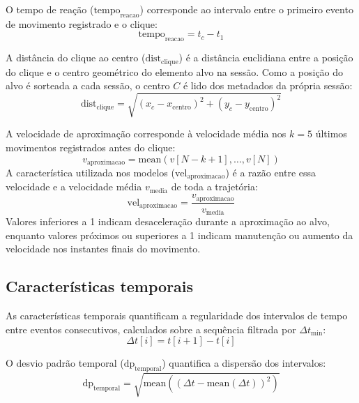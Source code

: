 O tempo de reação ($\text{tempo}_{\text{reacao}}$) corresponde ao intervalo entre o primeiro evento de movimento registrado e o clique:
\begin{equation}
    \text{tempo}_{\text{reacao}} = t_c - t_1
    \label{eq:tempo_reacao}
\end{equation}

A distância do clique ao centro ($\text{dist}_{\text{clique}}$) é a distância euclidiana entre a posição do clique e o centro geométrico do elemento alvo na sessão. Como a posição do alvo é sorteada a cada sessão, o centro $C$ é lido dos metadados da própria sessão:
\begin{equation}
    \text{dist}_{\text{clique}} = \sqrt{(x_c - x_{\text{centro}})^2 + (y_c - y_{\text{centro}})^2}
    \label{eq:dist_clique}
\end{equation}

A velocidade de aproximação corresponde à velocidade média nos $k = 5$ últimos movimentos registrados antes do clique:
\begin{equation}
    v_{\text{aproximacao}} = \text{mean}\left(v[N-k+1], \ldots, v[N]\right)
    \label{eq:v_aproximacao}
\end{equation}
A característica utilizada nos modelos ($\text{vel}_{\text{aproximacao}}$) é a razão entre essa velocidade e a velocidade média $v_{\text{media}}$ de toda a trajetória:
\begin{equation}
    \text{vel}_{\text{aproximacao}} = \frac{v_{\text{aproximacao}}}{v_{\text{media}}}
    \label{eq:vel_aproximacao}
\end{equation}
Valores inferiores a 1 indicam desaceleração durante a aproximação ao alvo, enquanto valores próximos ou superiores a 1 indicam manutenção ou aumento da velocidade nos instantes finais do movimento.

\subsection{Características temporais}

As características temporais quantificam a regularidade dos intervalos de tempo entre eventos consecutivos, calculados sobre a sequência filtrada por $\Delta t_{\min}$:
\begin{equation}
    \Delta t[i] = t[i+1] - t[i]
    \label{eq:delta_t}
\end{equation}

O desvio padrão temporal ($\text{dp}_{\text{temporal}}$) quantifica a dispersão dos intervalos:
\begin{equation}
    \text{dp}_{\text{temporal}} = \sqrt{\text{mean}\left((\Delta t - \text{mean}(\Delta t))^2\right)}
    \label{eq:dp_temporal}
\end{equation}

